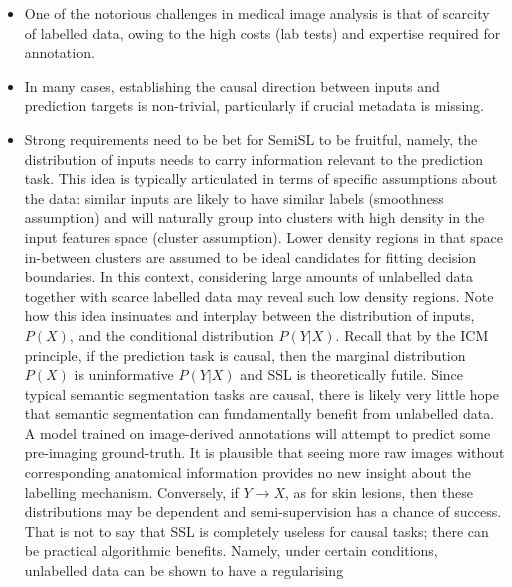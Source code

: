 \begin{itemize}
        \item One of the notorious challenges in medical image analysis is that of scarcity of
          labelled data, owing to the high costs (lab tests) and expertise required  for
          annotation.
        \item In many cases, establishing the causal direction between inputs and prediction
          targets is non-trivial, particularly if crucial metadata is missing.
        \item Strong requirements need to be bet for SemiSL to be fruitful, namely, the
          distribution of inputs needs to carry information relevant to the prediction task.
          This idea is typically articulated in terms of specific assumptions about the data:
          similar inputs are likely to have similar labels (smoothness assumption) and will
          naturally group into clusters with high density in the input features space (cluster
          assumption). Lower density regions in that space in-between clusters are assumed to be
          ideal candidates for fitting decision boundaries.
          In this context, considering large amounts of unlabelled data together with scarce
          labelled data may reveal such low density regions.
          Note how this idea insinuates and interplay between the distribution of inputs, \( P(X)
          \), and the conditional distribution \( P(Y|X) \). 
          Recall that by the ICM principle, if the prediction task is causal, then the marginal
          distribution \( P(X) \) is uninformative \wrt{} \( P(Y|X) \) and SSL is theoretically
          futile.
          Since typical semantic segmentation tasks are causal, there is likely very little hope
          that semantic segmentation can fundamentally benefit from unlabelled data.
          A model trained on image-derived annotations will attempt to predict some pre-imaging
          ground-truth. 
          It is plausible that seeing more raw images without corresponding anatomical information
          provides no new insight about the labelling mechanism.
          Conversely, if \( Y \to X \), as for skin lesions, then these distributions may be
          dependent and semi-supervision has a chance of success.
          That is not to say that SSL is completely  useless for causal tasks; there can be
          practical algorithmic benefits.
          Namely, under certain conditions, unlabelled data can be shown to have a regularising

\end{itemize}
